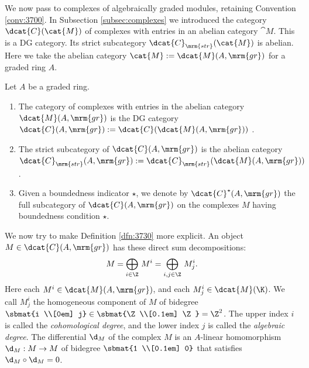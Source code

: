 We now pass to complexes of algebraically graded modules, retaining Convention 
\ref{conv:3700}. 
In Subsection \ref{subsec:complexes} we introduced the category 
$\dcat{C}(\cat{M})$ of complexes with entries in an abelian category $\cat{M}$.
This is a DG category. Its strict subcategory 
$\dcat{C}_{\mrm{str}}(\cat{M})$ is abelian. Here we take the abelian category 
$\cat{M} := \dcat{M}(A, \mrm{gr})$ for a graded ring $A$. 

\begin{dfn} \label{dfn:3730}
Let $A$ be a graded ring.
\begin{enumerate}
\item The category of complexes with entries in the abelian category 
$\dcat{M}(A, \mrm{gr})$ is the DG category 
$\dcat{C}(A, \mrm{gr}) := \dcat{C}(\dcat{M}(A, \mrm{gr}))$%
.

\item The strict subcategory of 
$\dcat{C}(A, \mrm{gr})$ is the abelian category  
$\dcat{C}_{\mrm{str}}(A, \mrm{gr}) := 
\dcat{C}_{\mrm{str}}(\dcat{M}(A, \mrm{gr}))$%
.

\item Given a boundedness indicator $\star$, we denote by 
$\dcat{C}^{\star}(A, \mrm{gr})$ the full subcategory of 
$\dcat{C}(A, \mrm{gr})$ on the complexes $M$ having boundedness condition 
$\star$. 
\end{enumerate}
\end{dfn}

We now try to make Definition \ref{dfn:3730} more explicit. 
An object $M \in \dcat{C}(A, \mrm{gr})$ has these direct sum decompositions:
\begin{equation} \label{eqn:3730}
M = \bigoplus_{i \in \Z} \, M^i = \bigoplus_{i, j \in \Z} \, M^i_j . 
\end{equation}
Here each $M^i \in \dcat{M}(A, \mrm{gr})$, and each
$M^i_j \in \dcat{M}(\K)$. 
We call $M^i_j$ the homogeneous component of $M$ of bidegree 
$\sbmat{i \\[0em] j} \in \sbmat{\Z \\[0.1em] \Z} = \Z^2$.
The upper index $i$ is called the {\em cohomological degree}, and the lower 
index $j$ is called the {\em algebraic degree}. 
The differential $\d_{M}$ of the complex $M$ is an $A$-linear homomorphism 
$\d_M : M \to M$ of bidegree $\sbmat{1 \\[0.1em] 0}$
that satisfies $\d_M \circ \d_M = 0$. 

